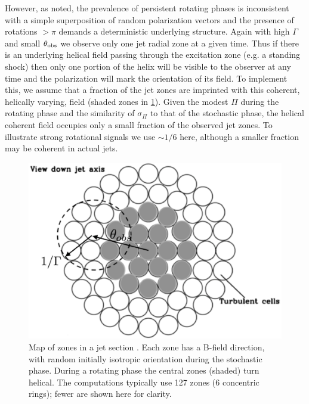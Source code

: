 However, as noted, the prevalence of persistent rotating phases is inconsistent with a simple superposition of random polarization vectors \citep{blinov_robopol:_2016} and the presence of rotations $>\pi$ demands a deterministic underlying structure. Again with high $\Gamma$ and small $\theta_{\rm obs}$ we observe only one jet radial zone at a given time. Thus if there is an underlying helical field passing through the excitation zone (e.g. a standing shock) then only one portion of the helix will be visible to the observer at any time and the polarization will mark the orientation of its field. To implement this, we assume that a fraction of the jet zones are imprinted with this coherent, helically varying, field (shaded zones in \cref{fig:f5}). Given the modest $\Pi$ during the rotating phase and the similarity of $\sigma_\Pi$ to that of the stochastic phase, the helical coherent field occupies only a small fraction of the observed jet zones. To illustrate strong rotational signals we use $\sim 1/6$ here, although a smaller fraction may be coherent in actual jets.
    
\begin{figure}[t]
\label{fig:f5}
\includegraphics[width=0.8\linewidth]{figures/f5.eps}
\centering
\caption{Map of zones in a jet section \citep{marscher_turbulent_2014}. Each zone has a B-field direction, with random initially isotropic orientation during the stochastic phase. During a rotating phase the central zones (shaded) turn helical. The computations typically use 127 zones (6 concentric rings); fewer are shown here for clarity.}
\end{figure}


